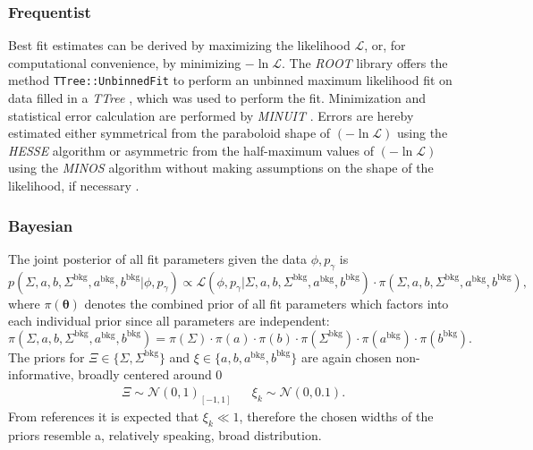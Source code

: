 \subsubsection{Frequentist}
Best fit estimates can be derived by maximizing the likelihood $\mathcal{L}$, or, for computational convenience, by minimizing $-\ln\mathcal{L}$. The \emph{ROOT} library \cite{root} offers the method \texttt{TTree::UnbinnedFit} to perform an unbinned maximum likelihood fit on data filled in a \emph{TTree} \cite{runbinnedFit}, which was used to perform the fit. Minimization and statistical error calculation are performed by \emph{MINUIT} \cite{minuit}. Errors are hereby estimated either symmetrical from the paraboloid shape of $(-\ln\mathcal{L})$ using the \emph{HESSE} algorithm or asymmetric from the half-maximum values of $(-\ln\mathcal{L})$ using the \emph{MINOS} algorithm without making assumptions on the shape of the likelihood, if necessary \cite{minuit}.  
\subsubsection{Bayesian}
The joint posterior of all fit parameters given the data $\phi,p_\gamma$ is 
\begin{equation}
	p\left(\Sigma,a,b,\Sigma^\text{bkg},a^\text{bkg},b^\text{bkg}\big|\phi,p_\gamma\right)\propto \mathcal{L}\left(\phi,p_\gamma\big|\Sigma,a,b,\Sigma^\text{bkg},a^\text{bkg},b^\text{bkg}\right)\cdot\pi\left(\Sigma,a,b,\Sigma^\text{bkg},a^\text{bkg},b^\text{bkg}\right),
\end{equation}
where $\pi(\boldsymbol{\theta})$ denotes the combined prior of all fit parameters which factors into each individual prior since all parameters are independent:
\begin{equation}
	\pi\left(\Sigma,a,b,\Sigma^\text{bkg},a^\text{bkg},b^\text{bkg}\right)=\pi\left(\Sigma\right)\cdot\pi\left(a\right)\cdot\pi\left(b\right)\cdot\pi\left(\Sigma^\text{bkg}\right)\cdot\pi\left(a^\text{bkg}\right)\cdot\pi\left(b^\text{bkg}\right).
\end{equation}
The priors for $\Xi\in\{\Sigma,\Sigma^\text{bkg}\}$ and $\xi\in\{a,b,a^\text{bkg},b^\text{bkg}\}$ are again chosen non-informative, broadly centered around 0
\begin{align}
	\Xi\sim\mathcal{N}(0,1)_{[-1,1]} &&\xi_k\sim\mathcal{N}(0,0.1).
	\label{eq:priors}
\end{align}
 From references \cite{farahphd,hartmannphd} it  is expected that $\xi_k\ll1$, therefore the chosen widths of the priors resemble a, relatively speaking, broad distribution. 
 
